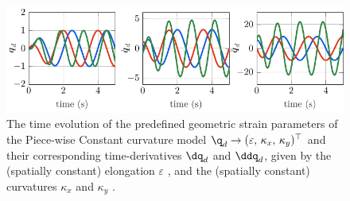 \begin{figure}[!h]
  \includegraphics*[width = \textwidth]{./pdf/thesis-figure-4-3.pdf}
  \vspace{-8mm}
  \caption{The time evolution of the predefined geometric strain parameters of the Piece-wise Constant curvature model $\q_d \to  (\varepsilon, \, \kappa_x,\,\kappa_y)^\top$ and their corresponding time-derivatives $\dq_d$ and $\ddq_d$, given by the (spatially constant) elongation $\varepsilon$ , and the  (spatially constant) curvatures $\kappa_x$  and $\kappa_y$ .}
  \label{fig:C2:EX1:strain_ref}
\end{figure}

